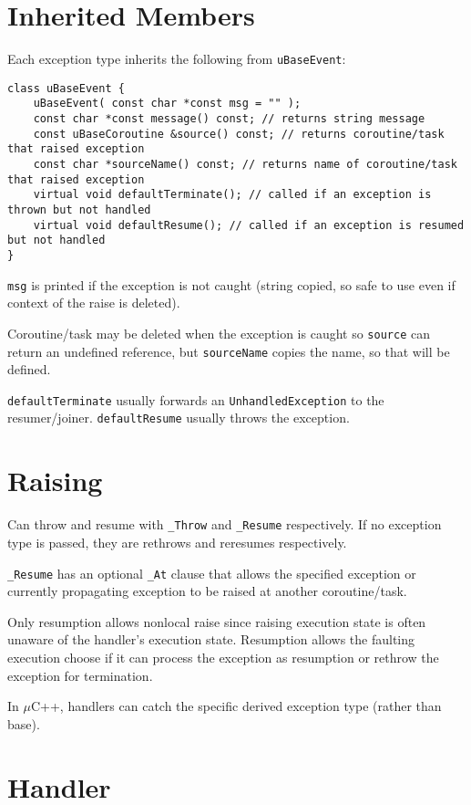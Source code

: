 \documentclass[11pt]{article}
\begin{document}
\section{Inherited Members}
\label{sec:orgf1c346f}
Each exception type inherits the following from \texttt{uBaseEvent}:
\begin{verbatim}
class uBaseEvent {
    uBaseEvent( const char *const msg = "" );
    const char *const message() const; // returns string message
    const uBaseCoroutine &source() const; // returns coroutine/task that raised exception
    const char *sourceName() const; // returns name of coroutine/task that raised exception
    virtual void defaultTerminate(); // called if an exception is thrown but not handled
    virtual void defaultResume(); // called if an exception is resumed but not handled
}
\end{verbatim}

\texttt{msg} is printed if the exception is not caught (string copied, so safe to use even if context
of the raise is deleted).

Coroutine/task may be deleted when the exception is caught so \texttt{source} can return an undefined
reference, but \texttt{sourceName} copies the name, so that will be defined.

\texttt{defaultTerminate} usually forwards an \texttt{UnhandledException} to the resumer/joiner.
\texttt{defaultResume} usually throws the exception.
\section{Raising}
\label{sec:org51063d3}
Can throw and resume with \texttt{\_Throw} and \texttt{\_Resume} respectively.
If no exception type is passed, they are rethrows and reresumes respectively.

\texttt{\_Resume} has an optional \texttt{\_At} clause that allows the specified exception or currently propagating
exception to be raised at another coroutine/task.

Only resumption allows nonlocal raise since raising execution state is often unaware of the handler's
execution state.
Resumption allows the faulting execution choose if it can process the exception as resumption or
rethrow the exception for termination.

In \(\mu\)C++, handlers can catch the specific derived exception type (rather than base).
\section{Handler}
\label{sec:org3a6eed5}
\end{document}
